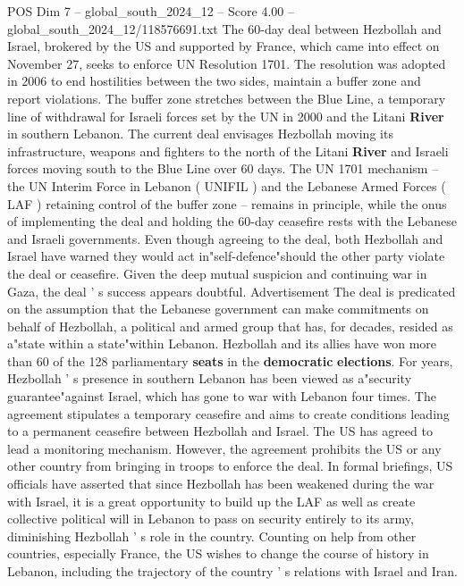 \begin{textsample}{POS Dim 7 – global\_south\_2024\_12 – Score 4.00 – global\_south\_2024\_12/118576691.txt}  \label{ex:f7_pos_354}
The 60-day deal between Hezbollah and Israel, brokered by the US and supported by France, which came into effect on November 27, seeks to enforce UN Resolution 1701.
The resolution was adopted in 2006 to end hostilities between the two sides, maintain a buffer zone and report violations.
The buffer zone stretches between the Blue Line, a temporary line of withdrawal for Israeli forces set by the UN in 2000 and the Litani \textbf{River} in southern Lebanon.
The current deal envisages Hezbollah moving its infrastructure, weapons and fighters to the north of the Litani \textbf{River} and Israeli forces moving south to the Blue Line over 60 days.
The UN 1701 mechanism -- the UN Interim Force in Lebanon ( UNIFIL ) and the Lebanese Armed Forces ( LAF ) retaining control of the buffer zone -- remains in principle, while the onus of implementing the deal and holding the 60-day ceasefire rests with the Lebanese and Israeli governments.
Even though agreeing to the deal, both Hezbollah and Israel have warned they would act in"self-defence"should the other party violate the deal or ceasefire.
Given the deep mutual suspicion and continuing war in Gaza, the deal ' s success appears doubtful.
Advertisement The deal is predicated on the assumption that the Lebanese government can make commitments on behalf of Hezbollah, a political and armed group that has, for decades, resided as a"state within a state"within Lebanon.
Hezbollah and its allies have won more than 60 of the 128 parliamentary \textbf{seats} in the \textbf{democratic} \textbf{elections}.
For years, Hezbollah ' s presence in southern Lebanon has been viewed as a"security guarantee"against Israel, which has gone to war with Lebanon four times.
The agreement stipulates a temporary ceasefire and aims to create conditions leading to a permanent ceasefire between Hezbollah and Israel.
The US has agreed to lead a monitoring mechanism.
However, the agreement prohibits the US or any other country from bringing in troops to enforce the deal.
In formal briefings, US officials have asserted that since Hezbollah has been weakened during the war with Israel, it is a great opportunity to build up the LAF as well as create collective political will in Lebanon to pass on security entirely to its army, diminishing Hezbollah ' s role in the country.
Counting on help from other countries, especially France, the US wishes to change the course of history in Lebanon, including the trajectory of the country ' s relations with Israel and Iran.

\end{textsample}
